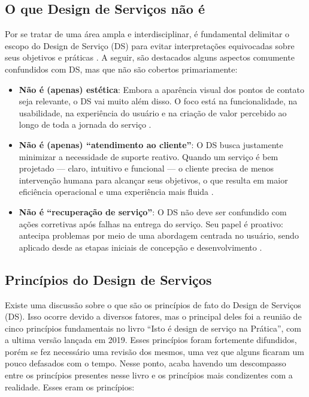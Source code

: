 \subsection{O que Design de Serviços não é}

Por se tratar de uma área ampla e interdisciplinar, é fundamental delimitar o escopo do Design de Serviço (DS) para evitar interpretações equivocadas sobre seus objetivos e práticas \cite{Polaine2013Orange}. A seguir, são destacados alguns aspectos comumente confundidos com DS, mas que não  são cobertos primariamente:

\begin{itemize}
	\item \textbf{Não é (apenas) estética}:  Embora a aparência visual dos pontos de contato seja relevante, o DS vai muito além disso. O foco está na funcionalidade, na usabilidade, na experiência do usuário e na criação de valor percebido ao longo de toda a jornada do serviço \cite{Polaine2013Orange}.
	
	\item \textbf{Não é (apenas) ``atendimento ao cliente''}: O DS busca justamente minimizar a necessidade de suporte reativo. Quando um serviço é bem projetado — claro, intuitivo e funcional — o cliente precisa de menos intervenção humana para alcançar seus objetivos, o que resulta em maior eficiência operacional e uma experiência mais fluida \cite{Stickdorn2019}.
	
	\item \textbf{Não é ``recuperação de serviço''}: O DS não deve ser confundido com ações corretivas após falhas na entrega do serviço. Seu papel é proativo: antecipa problemas por meio de uma abordagem centrada no usuário, sendo aplicado desde as etapas iniciais de concepção e desenvolvimento \cite{Patricio2011Multilevel}.
\end{itemize}


\subsection{Princípios do Design de Serviços}

Existe uma discussão sobre o que são os princípios de fato do Design de Serviços (DS). Isso ocorre devido a diversos fatores, mas o principal deles foi a reunião de cinco princípios fundamentais no livro ``Isto é design de serviço na Prática'', com a ultima versão lançada em 2019. Esses princípios foram fortemente difundidos, porém se fez necessário uma revisão dos mesmos, uma vez que alguns ficaram um pouco defasados com o tempo. Nesse ponto, acaba havendo um descompasso entre os princípios presentes nesse livro e os princípios mais condizentes com a realidade. Esses eram os princípios:

